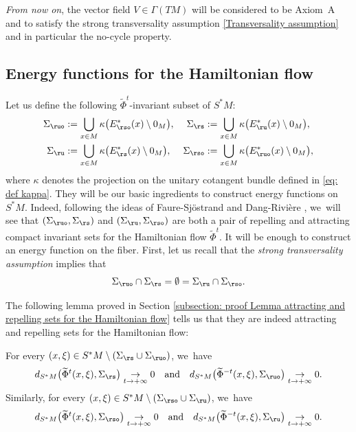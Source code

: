 \emph{From now on}, the vector field $V \in \Gamma (TM)$ will be considered to be Axiom~A and to satisfy the strong transversality assumption \eqref{Transversality assumption} and in particular the no-cycle property.

\subsection{Energy functions for the Hamiltonian flow}\label{subsection: energy function for the hamiltonian flow}

Let us define the following $\widetilde{\Phi}^t$-invariant subset of $S^*M$:
\begin{align*}
\Sigma_{\ruo} &:= \bigcup_{x \in M} \kappa \bigl(E_{\rso}^* (x) \setminus 0_M \bigr),& \Sigma_{\rs}&:= \bigcup_{x \in M} \kappa \bigl(E_\ru^* (x) \setminus 0_M \bigr),\\
\Sigma_{\ru} &:= \bigcup_{x \in M} \kappa \bigl(E_\rs^* (x) \setminus 0_M \bigr),& \Sigma_{\rso}&:= \bigcup_{x \in M} \kappa \bigl(E_{\ruo}^* (x) \setminus 0_M \bigr),
\end{align*}
where $\kappa$ denotes the projection on the unitary cotangent bundle defined in \eqref{eq: def kappa}.
They will be our basic ingredients to construct energy functions on $S^*M$. Indeed, following the ideas of Faure-Sjöstrand \cite{FS} and Dang-Rivière \cite{DR0, DRI}, we~will see that $(\Sigma_{\ruo},\Sigma_{\rs})$ and $(\Sigma_{\ru},\Sigma_{\rso})$ are both a pair of repelling and attracting compact invariant sets for the Hamiltonian flow $\widetilde{\Phi}^t$. It will be enough to construct an energy function on the fiber. First, let us recall that the \textit{strong transversality assumption} implies that
\[
\Sigma_{\ruo} \cap \Sigma_{\rs} = \emptyset = \Sigma_{\ru} \cap \Sigma_{\rso}.
\]

The following lemma proved in Section \ref{subsection: proof Lemma attracting and repelling sets for the Hamiltonian flow} tells us that they are indeed attracting and repelling sets for the Hamiltonian flow:

\begin{lemma}\label{lemma attractor and repeller on the phase space}
For every $(x,\xi) \in S^* M \setminus(\Sigma_{\rs} \cup \Sigma_{\ruo})$, we~have
\[
d_{S^* M} \bigl(\widetilde{\Phi}^{t} (x,\xi), \Sigma_{\rs} \bigr) \underset{t \to +\infty}{\to } 0 \quad\text{and}\quad
d_{S^* M} \bigl(\widetilde{\Phi}^{-t} (x,\xi), \Sigma_{\ruo} \bigr) \underset{t \to +\infty}{\to } 0.
\]
Similarly, for every $(x,\xi) \in S^* M \setminus \left(\Sigma_{\rso} \cup \Sigma_{\ru} \right)$, we~have
\[
d_{S^* M} \bigl(\widetilde{\Phi}^{t} (x,\xi), \Sigma_{\rso} \bigr) \underset{t \to +\infty}{\to } 0 \quad\text{and}\quad
d_{S^* M} \bigl(\widetilde{\Phi}^{-t} (x,\xi), \Sigma_{\ru} \bigr) \underset{t \to +\infty}{\to } 0.
\]
\end{lemma}

